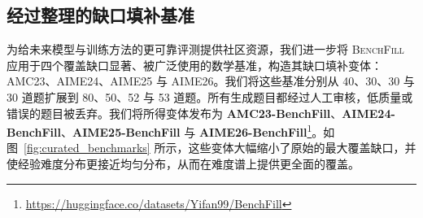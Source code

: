 \subsection{经过整理的缺口填补基准}
\label{sec:curated_benchmarks}

为给未来模型与训练方法的更可靠评测提供社区资源，我们进一步将 \textsc{BenchFill} 应用于四个覆盖缺口显著、被广泛使用的数学基准，构造其缺口填补变体：AMC23、AIME24、AIME25 与 AIME26。我们将这些基准分别从 40、30、30 与 30 道题扩展到 80、50、52 与 53 道题。所有生成题目都经过人工审核，低质量或错误的题目被丢弃。我们将所得变体发布为 \textbf{AMC23-BenchFill}、\textbf{AIME24-BenchFill}、\textbf{AIME25-BenchFill} 与 \textbf{AIME26-BenchFill}\footnote{\url{https://huggingface.co/datasets/Yifan99/BenchFill}}。如图~\ref{fig:curated_benchmarks} 所示，这些变体大幅缩小了原始的最大覆盖缺口，并使经验难度分布更接近均匀分布，从而在难度谱上提供更全面的覆盖。



